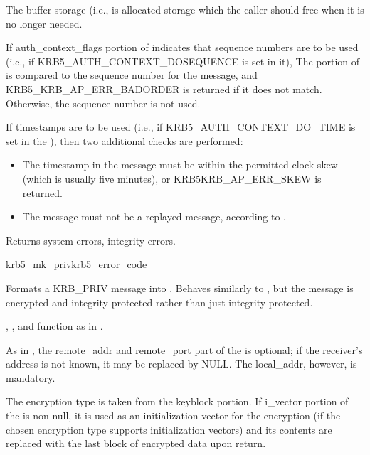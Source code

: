 The  buffer storage (i.e.,
 is allocated storage which the caller
should free when it is no longer needed.

If auth_context_flags portion of  indicates
that sequence numbers are to be used (i.e., if KRB5_AUTH_CONTEXT_DOSEQUENCE is
set in it), The  portion of
 is compared to the sequence number for the
message, and KRB5_KRB_AP_ERR_BADORDER is returned if it does not match.
Otherwise, the sequence number is not used.


If timestamps are to be used (i.e., if KRB5_AUTH_CONTEXT_DO_TIME is set
in the ), then two additional checks are performed:
\begin{itemize}
\item The timestamp in the message must be within the permitted clock
	skew (which is usually five minutes), or KRB5KRB_AP_ERR_SKEW
	is returned.
\item The message must not be a replayed message, according to
	.
\end{itemize}

Returns system errors, integrity errors.

\begin{funcdecl}{krb5_mk_priv}{krb5_error_code}{\funcinout}
\funcin
{}
\funcout
{}
\end{funcdecl}

Formats a KRB_PRIV message into .  Behaves similarly
to , but the message is encrypted and
integrity-protected rather than just integrity-protected.

, , 
 and
 function as in .

As in , the remote_addr and remote_port part of
the  is optional; if the receiver's address is
not known, it may be replaced by NULL.  The local_addr, however, is
mandatory.

The encryption type is taken from the  keyblock
portion. If i_vector portion of the 
is non-null, it is used as an initialization vector for the encryption
(if the chosen encryption type supports initialization vectors)
and its contents are replaced with the last block of encrypted data
upon return.

